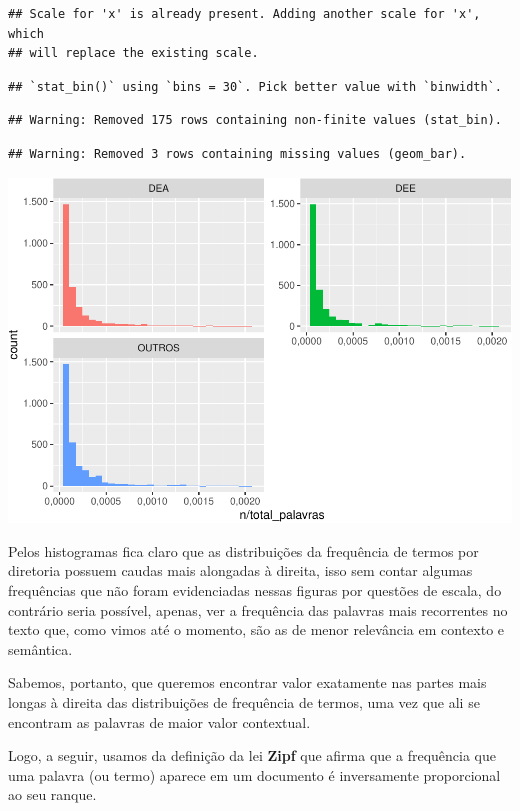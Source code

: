 \documentclass[]{article}
\begin{document}
\begin{verbatim}
## Scale for 'x' is already present. Adding another scale for 'x', which
## will replace the existing scale.
\end{verbatim}

\begin{verbatim}
## `stat_bin()` using `bins = 30`. Pick better value with `binwidth`.
\end{verbatim}

\begin{verbatim}
## Warning: Removed 175 rows containing non-finite values (stat_bin).
\end{verbatim}

\begin{verbatim}
## Warning: Removed 3 rows containing missing values (geom_bar).
\end{verbatim}

\includegraphics{markdown_v40_test_files/figure-latex/unnamed-chunk-27-1.pdf}

Pelos histogramas fica claro que as distribuições da frequência de
termos por diretoria possuem caudas mais alongadas à direita, isso sem
contar algumas frequências que não foram evidenciadas nessas figuras por
questões de escala, do contrário seria possível, apenas, ver a
frequência das palavras mais recorrentes no texto que, como vimos até o
momento, são as de menor relevância em contexto e semântica.

Sabemos, portanto, que queremos encontrar valor exatamente nas partes
mais longas à direita das distribuições de frequência de termos, uma vez
que ali se encontram as palavras de maior valor contextual.

Logo, a seguir, usamos da definição da lei \textbf{Zipf} que afirma que
a frequência que uma palavra (ou termo) aparece em um documento é
inversamente proporcional ao seu ranque.
\end{document}
